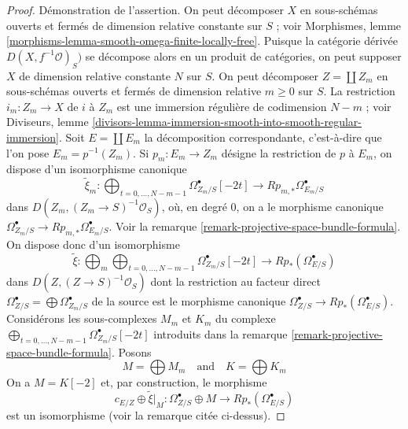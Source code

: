 \begin{proof}
\medskip\noindent
Démonstration de l'assertion. On peut décomposer $X$ en sous-schémas ouverts et fermés
de dimension relative constante sur $S$ ; voir
Morphismes, lemme \ref{morphisms-lemma-smooth-omega-finite-locally-free}.
Puisque la catégorie dérivée $D(X, f^{-1}\mathcal{O})_S)$ se décompose alors
en un produit de catégories, on peut supposer $X$ de
dimension relative constante $N$ sur $S$. On peut décomposer
$Z = \coprod Z_m$ en sous-schémas ouverts et fermés de dimension
relative $m \geq 0$ sur $S$. La restriction $i_m : Z_m \to X$ de
$i$ à $Z_m$ est une immersion régulière de codimension $N - m$ ; voir Diviseurs, lemme
\ref{divisors-lemma-immersion-smooth-into-smooth-regular-immersion}.
Soit $E = \coprod E_m$ la décomposition correspondante, c'est-à-dire
que l'on pose $E_m = p^{-1}(Z_m)$. Si $p_m : E_m \to Z_m$ désigne la
restriction de $p$ à $E_m$, on dispose d'un isomorphisme canonique
$$
\tilde \xi_m :
\bigoplus\nolimits_{t = 0, \ldots, N - m - 1}
\Omega^\bullet_{Z_m/S}[-2t]
\longrightarrow
Rp_{m, *}\Omega^\bullet_{E_m/S}
$$
dans $D(Z_m, (Z_m \to S)^{-1}\mathcal{O}_S)$,
où, en degré $0$, on a le morphisme canonique
$\Omega^\bullet_{Z_m/S} \to Rp_{m, *}\Omega^\bullet_{E_m/S}$.
Voir la remarque \ref{remark-projective-space-bundle-formula}.
On dispose donc d'un isomorphisme
$$
\tilde \xi :
\bigoplus\nolimits_m
\bigoplus\nolimits_{t = 0, \ldots, N - m - 1}
\Omega^\bullet_{Z_m/S}[-2t]
\longrightarrow
Rp_*(\Omega^\bullet_{E/S})
$$
dans $D(Z, (Z \to S)^{-1}\mathcal{O}_S)$
dont la restriction au facteur direct
$\Omega^\bullet_{Z/S} = \bigoplus \Omega^\bullet_{Z_m/S}$ de la source
est le morphisme canonique $\Omega^\bullet_{Z/S} \to Rp_*(\Omega^\bullet_{E/S})$.
Considérons les sous-complexes $M_m$ et $K_m$ du complexe
$\bigoplus\nolimits_{t = 0, \ldots, N - m - 1} \Omega^\bullet_{Z_m/S}[-2t]$
introduits dans la remarque \ref{remark-projective-space-bundle-formula}.
Posons
$$
M = \bigoplus M_m
\quad\text{and}\quad
K = \bigoplus K_m
$$
On a $M = K[-2]$ et, par construction, le morphisme
$$
c_{E/Z} \oplus \tilde \xi|_M :
\Omega^\bullet_{Z/S} \oplus M
\longrightarrow
Rp_*(\Omega^\bullet_{E/S})
$$
est un isomorphisme (voir la remarque citée ci-dessus).


\end{proof}
